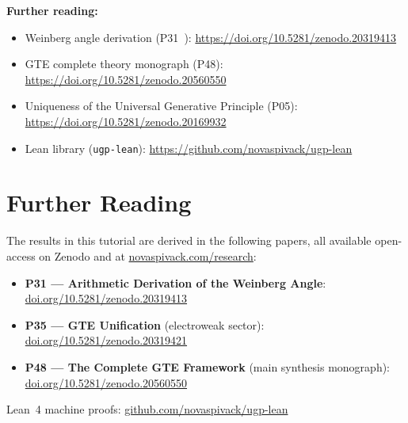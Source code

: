 \documentclass[11pt,a4paper]{article}
\begin{document}
\bigskip
\noindent
\textbf{Further reading:}
\begin{itemize}
  \item Weinberg angle derivation (P31~\cite{SpivackWeinberg}): \url{https://doi.org/10.5281/zenodo.20319413}
  \item GTE complete theory monograph (P48): \url{https://doi.org/10.5281/zenodo.20560550}
  \item Uniqueness of the Universal Generative Principle (P05): \url{https://doi.org/10.5281/zenodo.20169932}
  \item Lean library (\texttt{ugp-lean}): \url{https://github.com/novaspivack/ugp-lean}
\end{itemize}


\section*{Further Reading}
\begin{tcolorbox}[colback=orange!8,colframe=orange!50!black,
  title=\textbf{Primary Sources}]
The results in this tutorial are derived in the following papers,
all available open-access on Zenodo and at
\href{https://novaspivack.com/research}{novaspivack.com/research}:
\begin{itemize}
  \item \textbf{P31 --- Arithmetic Derivation of the Weinberg Angle}:\\
        \href{https://doi.org/10.5281/zenodo.20319413}{doi.org/10.5281/zenodo.20319413}
  \item \textbf{P35 --- GTE Unification} (electroweak sector):\\
        \href{https://doi.org/10.5281/zenodo.20319421}{doi.org/10.5281/zenodo.20319421}
  \item \textbf{P48 --- The Complete GTE Framework} (main synthesis monograph):\\
        \href{https://doi.org/10.5281/zenodo.20560550}{doi.org/10.5281/zenodo.20560550}
\end{itemize}
Lean~4 machine proofs: \href{https://github.com/novaspivack/ugp-lean}{github.com/novaspivack/ugp-lean}
\end{tcolorbox}


\end{document}
